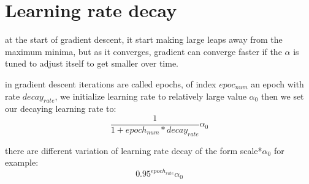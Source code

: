 \documentclass[4apaper,12pt]{book}
\begin{document}
\section{Learning rate decay}
\begin{description}
\item at the start of gradient descent, it start making large leaps away from the maximum minima, but as it converges, gradient can converge faster if the $\alpha$ is tuned to adjust itself to get smaller over time.
\item in  gradient descent iterations are called epochs, of index $epoc_{num}$ an epoch with rate $decay_{rate}$, we initialize learning rate to relatively large value $\alpha_0$ then we set our decaying learning rate to: $$\frac{1}{1+epoch_{num}*decay_{rate}}\alpha_0$$
\item there are different variation of learning rate decay of the form scale*$\alpha_0$ for example:
  $$0.95^{epoch_{rate}}\alpha_0 $$
\end{description}
\end{document}
